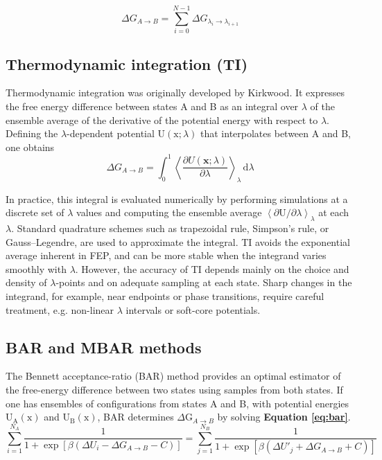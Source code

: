 \documentclass[12pt]{article}
\begin{document}
\begin{equation}
\Delta G_{A\to B} = \sum_{i=0}^{N-1} \Delta G_{\lambda_i \to \lambda_{i+1}}
\label{eq:FEPTOT}
\end{equation}



\subsection{Thermodynamic integration (TI)}

Thermodynamic integration was originally developed by Kirkwood\cite{CH10_kirkwood1935ti}. It expresses the free energy difference between states A and B as an integral over $\lambda$ of the ensemble average of the derivative of the potential energy with respect to $\lambda$. Defining the $\lambda$-dependent potential $\textrm{U}(\textrm{x};\lambda)$ that interpolates between A and B, one obtains
\begin{equation}
\Delta G_{A\to B} 
= \int_0^1 
\left\langle 
\frac{\partial U(\mathbf{x};\lambda)}{\partial \lambda}
\right\rangle_{\lambda}
\, \mathrm{d}\lambda
\end{equation}

In practice, this integral is evaluated numerically by performing simulations at a discrete set of $\lambda$ values and computing the ensemble average $\left\langle \partial \textrm{U}/\partial \lambda \right\rangle_\lambda$ at each $ \lambda$. Standard quadrature schemes such as trapezoidal rule, Simpson's rule, or Gauss--Legendre, are used to approximate the integral\cite{CH10_deruiter2013comparison}. TI avoids the exponential average inherent in FEP, and can be more stable when the integrand varies smoothly with $\lambda$. However, the accuracy of TI depends mainly on the choice and density of $\lambda$-points and on adequate sampling at each state. Sharp changes in the integrand, for example, near endpoints or phase transitions, require careful treatment, e.g. non-linear $\lambda$ intervals or soft-core potentials. 


\subsection{BAR and MBAR methods}

The Bennett acceptance-ratio (BAR) method provides an optimal estimator of the free-energy difference between two states using samples from both states\cite{CH10_bennett1976efficient}. If one has ensembles of configurations from states A and B, with potential energies $\textrm{U}_\textrm{A}(\textrm{x})$ and $\textrm{U}_\textrm{B}(\textrm{x})$, BAR determines $\Delta \textrm{G}_{A\to B}$ by solving \textbf{Equation \ref{eq:bar}}.
\begin{equation}
\sum_{i=1}^{N_A} 
\frac{1}{1 + \exp\left[ \beta \left( \Delta U_i - \Delta G_{A\to B} - C \right) \right]}
=
\sum_{j=1}^{N_B} 
\frac{1}{1 + \exp\left[ \beta \left( \Delta U'_j + \Delta G_{A\to B} + C \right) \right]}
\label{eq:bar}
\end{equation}
\end{document}
